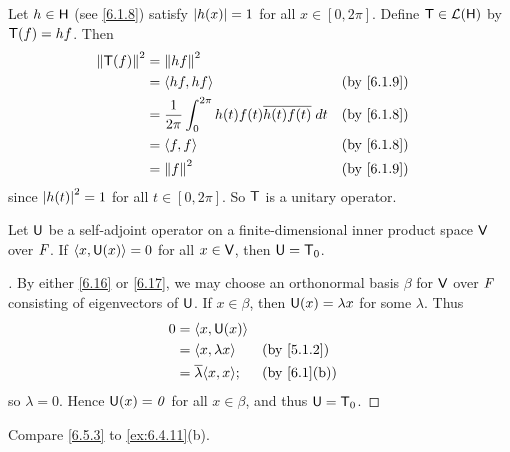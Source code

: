\begin{eg}\label{6.5.2}
  Let \(h \in \mathsf{H}\) (see \cref{6.1.8}) satisfy \(\left\lvert h(x)\right\rvert = 1\) for all \(x \in [0, 2 \pi]\).
  Define \(\mathsf{T} \in \mathcal{L}(\mathsf{H})\) by \(\mathsf{T}(f) = hf\).
  Then
  \begin{align*}
    \norm{\T(f)}^2 & = \norm{hf}^2                                                                     \\
                   & = \inn{hf, hf}                                                    &  & \by{6.1.9} \\
                   & = \frac{1}{2 \pi} \int_0^{2 \pi} h(t) f(t) \conj{h(t) f(t)} \; dt &  & \by{6.1.8} \\
                   & = \inn{f, f}                                                      &  & \by{6.1.8} \\
                   & = \norm{f}^2                                                      &  & \by{6.1.9}
  \end{align*}
  since \(\left\lvert h(t)\right\rvert^2 = 1\) for all \(t \in [0, 2 \pi]\).
  So \(\mathsf{T}\) is a unitary operator.
\end{eg}

\begin{lem}\label{6.5.3}
  Let \(\mathsf{U}\) be a self-adjoint operator on a finite-dimensional inner product space \(\mathsf{V}\) over \(\mathit{F}\).
  If \(\left\langle x, \mathsf{U}(x)\right\rangle = 0\) for all \(x \in \mathsf{V}\), then \(\mathsf{U} = \mathsf{T}_0\).
\end{lem}

\begin{proof}[]
  By either \cref{6.16} or \cref{6.17}, we may choose an orthonormal basis \(\beta\) for \(\mathsf{V}\) over \(\mathit{F}\) consisting of eigenvectors of \(\mathsf{U}\).
  If \(x \in \beta\), then \(\mathsf{U}(x) = \lambda x\) for some \(\lambda\).
  Thus
  \begin{align*}
    0 & = \inn{x, \U(x)}                              \\
      & = \inn{x, \lambda x}         &  & \by{5.1.2}  \\
      & = \conj{\lambda} \inn{x, x}; &  & \by{6.1}[b]
  \end{align*}
  so \(\lambda = 0\).
  Hence \(\mathsf{U}(x) = \mathit{0}\) for all \(x \in \beta\), and thus \(\mathsf{U} = \mathsf{T}_0\).
\end{proof}

\begin{note}
  Compare \cref{6.5.3} to \cref{ex:6.4.11}(b).
\end{note}

